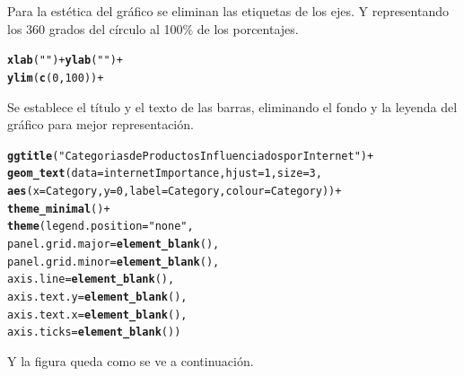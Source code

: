 \documentclass{article}\usepackage[]{graphicx}\usepackage[]{color}
\makeatletter
\newcommand{\hlnum}[1]{\textcolor[rgb]{0.686,0.059,0.569}{#1}}%
\newcommand{\hlstr}[1]{\textcolor[rgb]{0.192,0.494,0.8}{#1}}%
\newcommand{\hlopt}[1]{\textcolor[rgb]{0,0,0}{#1}}%
\newcommand{\hlstd}[1]{\textcolor[rgb]{0.345,0.345,0.345}{#1}}%
\newcommand{\hlkwc}[1]{\textcolor[rgb]{0.333,0.667,0.333}{#1}}%
\newcommand{\hlkwd}[1]{\textcolor[rgb]{0.737,0.353,0.396}{\textbf{#1}}}%
\newenvironment{kframe}{%
 \def\at@end@of@kframe{}%
 \ifinner\ifhmode%
  \def\at@end@of@kframe{\end{minipage}}%
  \begin{minipage}{\columnwidth}%
 \fi\fi%
 \def\FrameCommand##1{\hskip\@totalleftmargin \hskip-\fboxsep
 \colorbox{shadecolor}{##1}\hskip-\fboxsep
     \hskip-\linewidth \hskip-\@totalleftmargin \hskip\columnwidth}%
 \MakeFramed {\advance\hsize-\width
   \@totalleftmargin\z@ \linewidth\hsize
   \@setminipage}}%
 {\par\unskip\endMakeFramed%
 \at@end@of@kframe}
\newenvironment{knitrout}{}{} %
\makeatother
\begin{document}
\clearpage
Para la est\'etica del gr\'afico se eliminan las etiquetas de los ejes. Y representando los 360 grados del c\'irculo al 100\% de los porcentajes.
\begin{knitrout}
\color{fgcolor}\begin{kframe}
\begin{alltt}
  \hlkwd{xlab}(\hlstr{""}) + \hlkwd{ylab}(\hlstr{""}) +
  \hlkwd{ylim}(\hlkwd{c}(0,100)) +
\end{alltt}
\end{kframe}
\end{knitrout}
Se establece el t\'itulo y el texto de las barras, eliminando el fondo y la leyenda del gr\'afico para mejor representaci\'on.
\begin{knitrout}
\color{fgcolor}\begin{kframe}
\begin{alltt}
  \hlkwd{ggtitle}\hlstd{(}\hlstr{"Categorias de Productos Influenciados por Internet"}\hlstd{)} \hlopt{+}
  \hlkwd{geom_text}\hlstd{(}\hlkwc{data} \hlstd{= internetImportance,} \hlkwc{hjust} \hlstd{=} \hlnum{1}\hlstd{,} \hlkwc{size} \hlstd{=} \hlnum{3}\hlstd{,}
            \hlkwd{aes}\hlstd{(}\hlkwc{x} \hlstd{= Category,} \hlkwc{y} \hlstd{=} \hlnum{0}\hlstd{,} \hlkwc{label} \hlstd{= Category,} \hlkwc{colour} \hlstd{= Category))} \hlopt{+}
  \hlkwd{theme_minimal}\hlstd{()} \hlopt{+}
  \hlkwd{theme}\hlstd{(}\hlkwc{legend.position} \hlstd{=} \hlstr{"none"}\hlstd{,}
        \hlkwc{panel.grid.major} \hlstd{=} \hlkwd{element_blank}\hlstd{(),}
        \hlkwc{panel.grid.minor} \hlstd{=} \hlkwd{element_blank}\hlstd{(),}
        \hlkwc{axis.line} \hlstd{=} \hlkwd{element_blank}\hlstd{(),}
        \hlkwc{axis.text.y} \hlstd{=} \hlkwd{element_blank}\hlstd{(),}
        \hlkwc{axis.text.x} \hlstd{=} \hlkwd{element_blank}\hlstd{(),}
        \hlkwc{axis.ticks} \hlstd{=} \hlkwd{element_blank}\hlstd{())}
\end{alltt}
\end{kframe}
\end{knitrout}
Y la figura queda como se ve a continuaci\'on.~\\~\\
\end{document}
